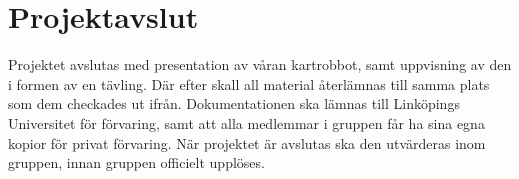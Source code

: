 \documentclass[a4paper,11pt]{article}
\begin{document}
    \section{Projektavslut}
    Projektet avslutas med presentation av våran kartrobbot, samt uppvisning av den i formen av en tävling. Där efter skall all material återlämnas till samma plats som dem checkades ut ifrån. Dokumentationen ska lämnas till Linköpings Universitet för förvaring, samt att alla medlemmar i gruppen får ha sina egna kopior för privat förvaring. När projektet är avslutas ska den utvärderas inom gruppen, innan gruppen officielt upplöses.
    
    \begin{appendices}
    \end{appendices}
    \clearpage
    \printbibliography
\end{document}
